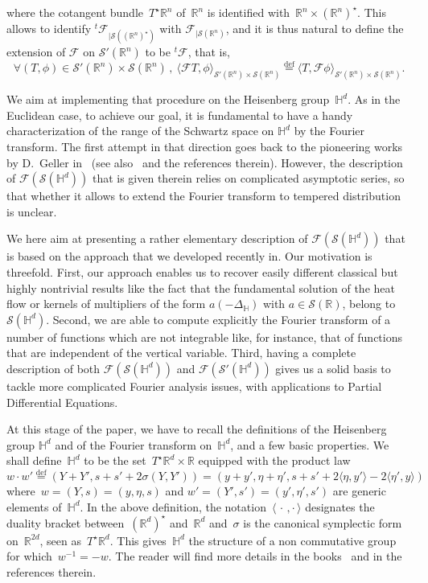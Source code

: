 \documentclass[10pt]{amsart}
\theoremstyle{definition}\newtheorem{defi}[theo]{Definition}\newtheorem{rema}[theo]{Remark}\newtheorem{exam}[theo]{Example}\newtheorem{exem}[theo]{Example}\newtheorem{nota}[theo]{Notation}
\newcommand{\D}{\Delta}
\newcommand*\cF{\mathcal{F}}
\newcommand*\cS{\mathcal{S}}
\newcommand*\R{\mathbb{R}}
\newcommand*\bbH{\mathbb{H}}
\newcommand*\eqdefa{\overset{\mathrm{def}}{=}}
\let\oldforall\forall
\renewcommand*{\forall}{\mathrel{\oldforall}}
\begin{document}
where the cotangent bundle~$T^\star \R^n$ of~$\R^n$ is identified with~$\R^n\times (\R^n)^\star$. This allows to identify ${}^t\!\cF_{|\cS((\R^n)^\star)}$ with $\cF_{|\cS(\R^n)}$, and it is thus natural to define the extension of $\cF$ on $\cS'(\R^n)$ to be ${}^t\!\cF$, that is,
\begin{equation}\label{definFourierS'}
\forall (T,\phi) \in \cS'(\R^n)\times\cS(\R^n)\,,\ \langle \cF T,\phi\rangle_{\cS'(\R^n)\times\cS(\R^n)}\eqdefa \langle T,\cF \phi\rangle_{\cS'(\R^n)\times\cS(\R^n)}.
\end{equation}

We aim at implementing that procedure on the Heisenberg group~$\bbH^d$. As in the Euclidean case, to achieve our goal, it is fundamental to have a handy characterization of the range of the Schwartz space on $\bbH^d$ by the Fourier transform. The first attempt in that direction goes back to the pioneering works by D.~Geller in~\cite{geller, geller2} (see also~\cite{astengo2,F,thangavelu2} and the references therein). However, the description of $\cF(\cS(\bbH^d))$ that is given therein relies on complicated asymptotic series, so that whether it allows to extend the Fourier transform to tempered distribution is unclear.

We here aim at presenting a rather elementary description of $\cF(\cS(\bbH^d))$ that is based on the approach that we developed recently in\cite{bcdFHspace}. Our motivation is threefold. First, our approach enables us to recover easily different classical but highly nontrivial results like the fact that the fundamental solution of the heat flow or kernels of multipliers of the form $a(-\D_\bbH)$ with $a\in\cS(\R)$, belong to $\cS(\bbH^d)$. Second, we are able to compute explicitly the Fourier transform of a number of functions which are not integrable like, for instance, that of functions that are independent of the vertical variable. Third, having a complete description of both $\cF(\cS(\bbH^d))$ and $\cF(\cS'(\bbH^d))$ gives us a solid basis to tackle more complicated Fourier analysis issues, with applications to Partial Differential Equations.

At this stage of the paper, we have to recall the definitions of the Heisenberg group $\bbH^d$ and of the Fourier transform on~$\bbH^d$, and a few basic properties. We shall define~$\bbH^d$ to be the set~$T^\star\R^d \times\R$ equipped with the product law
\[
w\cdot w'\eqdefa
\left(Y+Y', s+s'+ 2\sigma(Y,Y')\right) = \left(y+y', \eta+\eta', s+s'+2 \langle \eta,y'\rangle -2\langle \eta',y\rangle\right)
\]
where~$w=(Y,s)=(y,\eta,s)$ and $w'=(Y',s')=(y',\eta',s')$ are generic elements of~$\bbH^d$. In the above definition, the notation~$\langle{\,\cdot\,,\cdot\,}\rangle$ designates the duality bracket between~$(\R^d)^\star $ and~$\R^d$ and~$\sigma$ is the canonical symplectic form on~$\R^{2d}$, seen as~$T^\star\R^d$. This gives~$\bbH^d$ the structure of a non commutative group for which~$w^{-1}=-w$. The reader will find more details in the books~\cite{bfg, farautharzallah, fisher, folland, follandstein, stein2, taylor1, thangavelu} and in the references therein.
\end{document}
